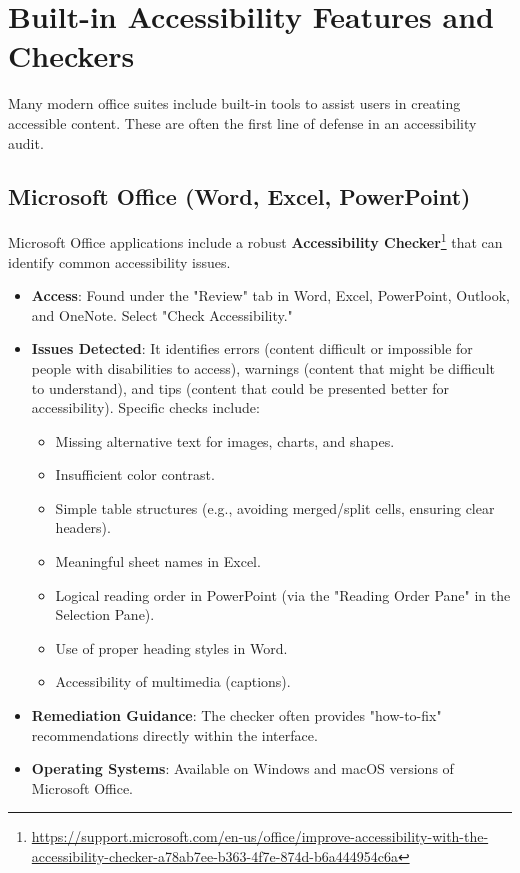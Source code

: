 \section{Built-in Accessibility Features and Checkers}

Many modern office suites include built-in tools to assist users in creating accessible content. These are often the first line of defense in an accessibility audit.

\subsection{Microsoft Office (Word, Excel, PowerPoint)}
Microsoft Office applications include a robust \textbf{Accessibility Checker}\footnote{\url{https://support.microsoft.com/en-us/office/improve-accessibility-with-the-accessibility-checker-a78ab7ee-b363-4f7e-874d-b6a444954c6a}} that can identify common accessibility issues.
\begin{itemize}
    \item \textbf{Access}: Found under the "Review" tab in Word, Excel, PowerPoint, Outlook, and OneNote. Select "Check Accessibility."
    \item \textbf{Issues Detected}: It identifies errors (content difficult or impossible for people with disabilities to access), warnings (content that might be difficult to understand), and tips (content that could be presented better for accessibility). Specific checks include:
        \begin{itemize}
            \item Missing alternative text for images, charts, and shapes.
            \item Insufficient color contrast.
            \item Simple table structures (e.g., avoiding merged/split cells, ensuring clear headers).
            \item Meaningful sheet names in Excel.
            \item Logical reading order in PowerPoint (via the "Reading Order Pane" in the Selection Pane).
            \item Use of proper heading styles in Word.
            \item Accessibility of multimedia (captions).
        \end{itemize}
    \item \textbf{Remediation Guidance}: The checker often provides "how-to-fix" recommendations directly within the interface.
    \item \textbf{Operating Systems}: Available on Windows and macOS versions of Microsoft Office.
\end{itemize}

